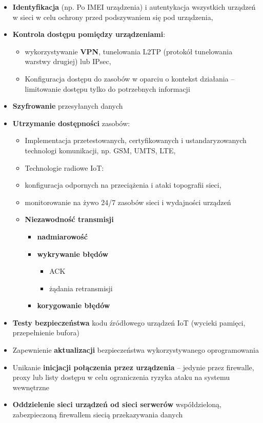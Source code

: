\begin{itemize}
	\item \textbf{Identyfikacja} (np. Po IMEI urządzenia) i autentykacja wszystkich urządzeń w sieci w celu ochrony przed podszywaniem się pod urządzenia,
	\item \textbf{Kontrola dostępu pomiędzy urządzeniami}:
	\begin{itemize}
		\item wykorzystywanie \textbf{VPN}, tunelowania L2TP (protokół tunelowania warstwy drugiej) lub IPsec,
		\item Konfiguracja dostępu do zasobów w oparciu o kontekst działania – limitowanie dostępu tylko do potrzebnych informacji
	\end{itemize}
	\item \textbf{Szyfrowanie} przesyłanych danych
	\item \textbf{Utrzymanie dostępności} zasobów:
	\begin{itemize}
		\item Implementacja przetestowanych, certyfikowanych i  ustandaryzowanych technologi komunikacji, np. GSM, UMTS, LTE, 
		\item Technologie radiowe IoT:
		\item konfiguracja odpornych na przeciążenia i ataki topografii sieci, 
		\item monitorowanie na żywo 24/7 zasobów sieci i wydajności urządzeń
		\item \textbf{Niezawodność transmisji}
		\begin{itemize}
			\item \textbf{nadmiarowość}
			\item \textbf{wykrywanie błędów}
			\begin{itemize}
				\item ACK
				\item żądania retransmisji
			\end{itemize}
			\item \textbf{korygowanie błędów}
		\end{itemize}
	\end{itemize}
	\item \textbf{Testy bezpieczeństwa} kodu źródłowego urządzeń IoT (wycieki pamięci, przepełnienie bufora)
	\item Zapewnienie \textbf{aktualizacji} bezpieczeństwa wykorzystywanego oprogramowania
	\item Unikanie \textbf{inicjacji połączenia przez urządzenia} – jedynie przez firewalle, proxy lub listy dostępu w celu ograniczenia ryzyka ataku na systemu wewnętrzne
	\item \textbf{Oddzielenie sieci urządzeń od sieci serwerów} współdzieloną, zabezpieczoną firewallem siecią przekazywania danych
\end{itemize}

